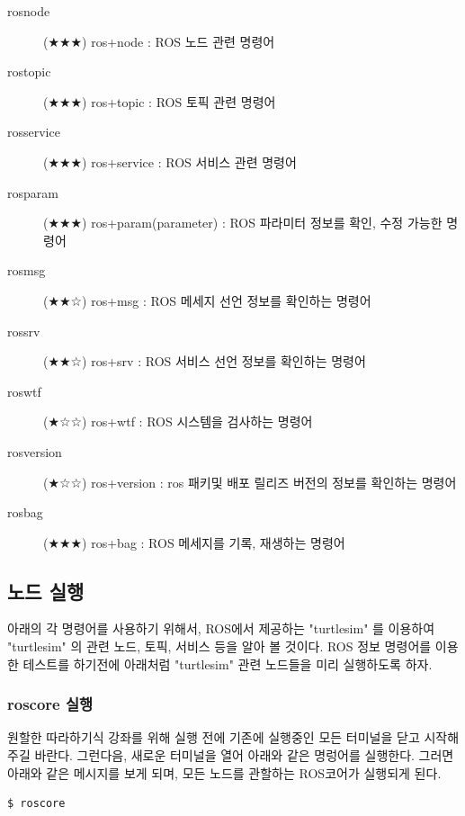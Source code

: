 \vspace{\baselineskip}
\noindent
\begin{description}
\item[rosnode] (★★★) ros+node : ROS 노드 관련 명령어
\item[rostopic] (★★★) ros+topic : ROS 토픽 관련 명령어
\item[rosservice] (★★★) ros+service : ROS 서비스 관련 명령어
\item[rosparam] (★★★) ros+param(parameter) : ROS 파라미터 정보를 확인, 수정 가능한 명령어
\item[rosmsg] (★★☆) ros+msg : ROS 메세지 선언 정보를 확인하는 명령어
\item[rossrv] (★★☆) ros+srv : ROS 서비스 선언 정보를 확인하는 명령어
\item[roswtf] (★☆☆) ros+wtf : ROS 시스템을 검사하는 명령어
\item[rosversion] (★☆☆) ros+version : ros 패키및 배포 릴리즈 버전의 정보를 확인하는 명령어
\item[rosbag] (★★★) ros+bag : ROS 메세지를 기록, 재생하는 명령어
\end{description}

\subsection{노드 실행}

아래의 각 명령어를 사용하기 위해서, ROS에서 제공하는 "turtlesim" 를 이용하여 "turtlesim" 의 관련 노드, 토픽, 서비스 등을 알아 볼 것이다. ROS 정보 명령어를 이용한 테스트를 하기전에 아래처럼 "turtlesim" 관련 노드들을 미리 실행하도록 하자.

\subsubsection{roscore 실행}

원할한 따라하기식 강좌를 위해 실행 전에 기존에 실행중인 모든 터미널을 닫고 시작해 주길 바란다. 그런다음, 새로운 터미널을 열어 아래와 같은 명렁어를 실행한다. 그러면 아래와 같은 메시지를 보게 되며, 모든 노드를 관할하는 ROS코어가 실행되게 된다.

\begin{lstlisting}[language=bash]
$ roscore
\end{lstlisting}

